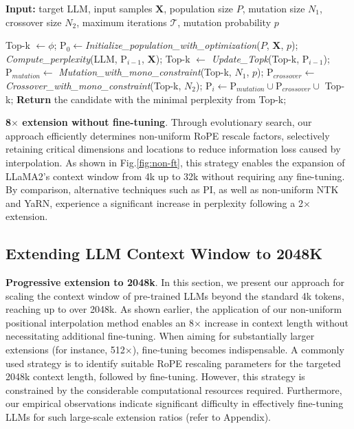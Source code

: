 \begin{algorithm}[t]
	\small
	\caption{The search algorithm}
	\textbf{Input:} target LLM, input samples $\mathbf{X}$, population size $P$, mutation size $N_1$, crossover size $N_2$, maximum iterations $\mathcal{T}$, mutation probability $p$ \\

	\begin{algorithmic}[1]
		\label{alg:search}
		\STATE Top-k $\leftarrow \phi$;	
		\STATE $\text{P}_0 \leftarrow$\textit{Initialize\_population\_with\_optimization}($P$, $\mathbf{X}$, $p$); 
		\STATE \textit{Compute\_perplexity}(LLM, $\text{P}_{i-1}$, $\mathbf{X}$);
		\STATE Top-k $\leftarrow$ \textit{Update\_Topk}(Top-k, $\text{P}_{i-1}$);
		\STATE $\text{P}_{mutation} \leftarrow$ \textit{Mutation\_with\_mono\_constraint}(Top-k, $N_1$, $p$); 
		\STATE $\text{P}_{crossover} \leftarrow$ \textit{Crossover\_with\_mono\_constraint}(Top-k, $N_2$);
		\STATE $\text{P}_i \leftarrow \text{P}_{mutation} \cup \text{P}_{crossover} \cup$ Top-k;
		\ENDFOR
		\STATE \textbf{Return} the candidate with the minimal perplexity from Top-k;
	\end{algorithmic}
\end{algorithm}

\textbf{8$\times$ extension without fine-tuning}. Through evolutionary search, our approach efficiently determines non-uniform RoPE rescale factors, selectively retaining critical dimensions and locations to reduce information loss caused by interpolation. As shown in Fig.\ref{fig:non-ft}, this strategy enables the expansion of LLaMA2's context window from 4k up to 32k without requiring any fine-tuning. By comparison, alternative techniques such as PI, as well as non-uniform NTK and YaRN, experience a significant increase in perplexity following a 2$\times$ extension.

\subsection{Extending LLM Context Window to 2048K}
\label{sec:extendto2048k}

\textbf{Progressive extension to 2048k}. In this section, we present our approach for scaling the context window of pre-trained LLMs beyond the standard 4k tokens, reaching up to over 2048k. As shown earlier, the application of our non-uniform positional interpolation method enables an 8$\times$ increase in context length without necessitating additional fine-tuning. When aiming for substantially larger extensions (for instance, 512$\times$), fine-tuning becomes indispensable. A commonly used strategy is to identify suitable RoPE rescaling parameters for the targeted 2048k context length, followed by fine-tuning. However, this strategy is constrained by the considerable computational resources required. Furthermore, our empirical observations indicate significant difficulty in effectively fine-tuning LLMs for such large-scale extension ratios (refer to Appendix).

